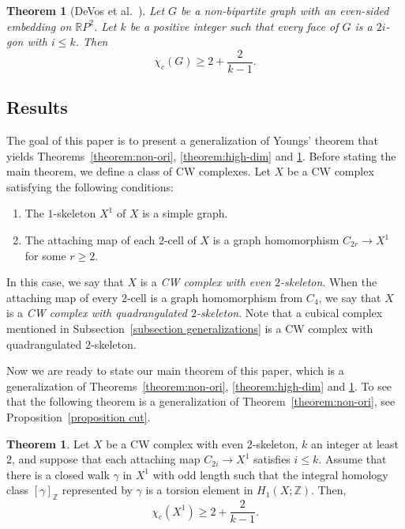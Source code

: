 \documentclass[11pt, amsfonts]{amsart}
\numberwithin{equation}{section}
\newtheorem{theorem}[thm]{Theorem}
\theoremstyle{definition}
\newtheorem{theoremalpha}{Theorem} %
\theoremstyle{remark}
\newcommand{\ZZ}{\mathbb{Z}}
\newcommand{\RR}{\mathbb{R}}
\begin{document}
\begin{theorem}[DeVos et al.~\cite{DGMVZ}]\label{theorem:circular}
Let $G$ be a non-bipartite graph with an even-sided embedding on $\RR P^2$.
Let $k$ be a positive integer such that every face of $G$ is a $2i$-gon with $i \le k$.
Then
\[ \chi_c(G) \ge 2 + \frac{2}{k-1}.\]
\end{theorem}

\subsection{Results}

The goal of this paper is to present a generalization of Youngs' theorem that yields Theorems~\ref{theorem:non-ori}, \ref{theorem:high-dim} and \ref{theorem:circular}. Before stating the main theorem, we define a class of CW complexes. Let $X$ be a CW complex satisfying the following conditions:

\begin{enumerate}[(1)]
\item The $1$-skeleton $X^1$ of $X$ is a simple graph.

\item The attaching map of each $2$-cell of $X$ is a graph homomorphism $C_{2r} \to X^1$ for some $r \ge 2$.
\end{enumerate}
In this case, we say that $X$ is a \emph{CW complex with even $2$-skeleton}. When the attaching map of every $2$-cell is a graph homomorphism from $C_4$, we say that $X$ is a \emph{CW complex with quadrangulated $2$-skeleton}. Note that a cubical complex mentioned in Subsection~\ref{subsection generalizations} is a CW complex with quadrangulated $2$-skeleton.

Now we are ready to state our main theorem of this paper, which is a generalization of Theorems~\ref{theorem:non-ori}, \ref{theorem:high-dim} and \ref{theorem:circular}. To see that the following theorem is a generalization of Theorem~\ref{theorem:non-ori}, see Proposition~\ref{proposition cut}.

\begin{theoremalpha} \label{theorem main}
Let \( X \) be a CW complex with even 2-skeleton, $k$ an integer at least $2$, and suppose that each attaching map \( C_{2i} \to X^1 \) satisfies \( i \le k \).
Assume that there is a closed walk \( \gamma \) in \( X^1 \) with odd length such that the integral homology class $[\gamma]_{\ZZ}$ represented by $\gamma$ is a torsion element in $H_1(X ; \ZZ)$. Then,
\[ \chi_c(X^1) \ge 2 + \frac{2}{k - 1}. \]
\end{theoremalpha}
\end{document}
